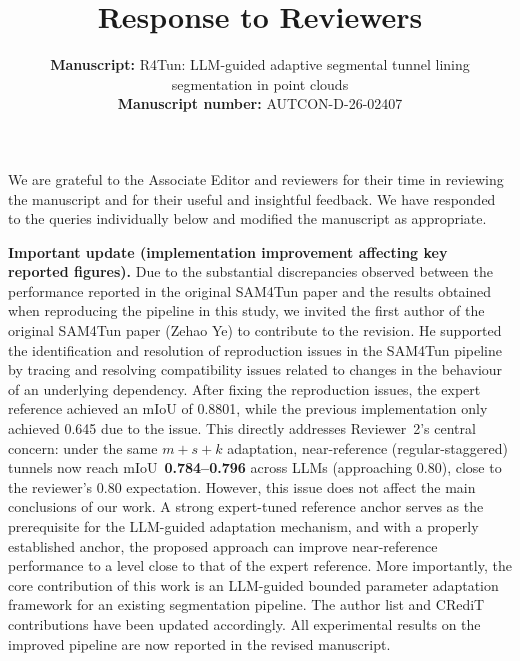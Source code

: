 \documentclass[11pt,a4paper]{article}
\title{Response to Reviewers}
\author{%
  \parbox{\textwidth}{%
    \textbf{Manuscript:} R4Tun: LLM-guided adaptive segmental tunnel lining segmentation in point clouds\\[0.4em]
    \textbf{Manuscript number:} AUTCON-D-26-02407
  }%
}
\date{}
\begin{document}
\maketitle

We are grateful to the Associate Editor and reviewers for their time in reviewing the manuscript and for their useful and insightful feedback. We have responded to the queries individually below and modified the manuscript as appropriate.

\textbf{Important update (implementation improvement affecting key reported figures).} Due to the substantial discrepancies observed between the performance reported in the original SAM4Tun paper and the results obtained when reproducing the pipeline in this study, we invited the first author of the original SAM4Tun paper (Zehao Ye) to contribute to the revision. He supported the identification and resolution of reproduction issues in the SAM4Tun pipeline by tracing and resolving compatibility issues related to changes in the behaviour of an underlying dependency. After fixing the reproduction issues, the expert reference achieved an mIoU of 0.8801, while the previous implementation only achieved 0.645 due to the issue. This directly addresses Reviewer~2's central concern: under the same $m+s+k$ adaptation, near-reference (regular-staggered) tunnels now reach mIoU~\textbf{0.784--0.796} across LLMs (approaching 0.80), close to the reviewer's 0.80 expectation. However, this issue does not affect the main conclusions of our work. A strong expert-tuned reference anchor serves as the prerequisite for the LLM-guided adaptation mechanism, and with a properly established anchor, the proposed approach can improve near-reference performance to a level close to that of the expert reference. More importantly, the core contribution of this work is an LLM-guided bounded parameter adaptation framework for an existing segmentation pipeline. The author list and CRediT contributions have been updated accordingly. All experimental results on the improved pipeline are now reported in the revised manuscript.
\end{document}
